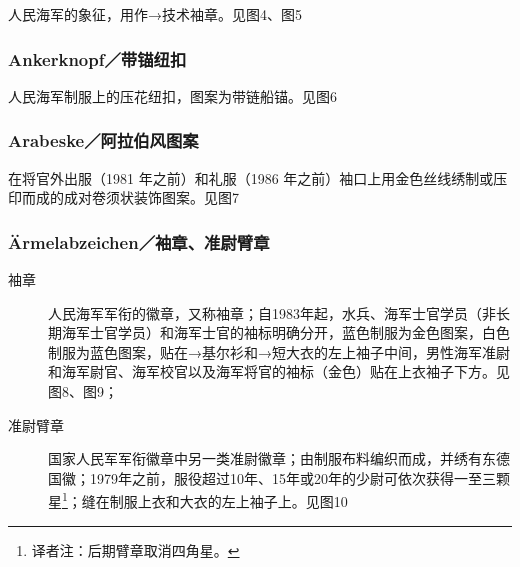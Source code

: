 人民海军的象征，用作→技术袖章。见图4、图5

\subsubsection*{Ankerknopf／带锚纽扣}%

人民海军制服上的压花纽扣，图案为带链船锚。见图6

\subsubsection*{Arabeske／阿拉伯风图案}

在将官外出服（1981 年之前）和礼服（1986 年之前）袖口上用金色丝线绣制或压印而成的成对卷须状装饰图案。见图7

\subsubsection*{Ärmelabzeichen／袖章、准尉臂章}

\begin{description}

    \item[袖章] 人民海军军衔的徽章，又称袖章；自1983年起，水兵、海军士官学员（非长期海军士官学员）和海军士官的袖标明确分开，蓝色制服为金色图案，白色制服为蓝色图案，贴在→基尔衫和→短大衣的左上袖子中间，男性海军准尉和海军尉官、海军校官以及海军将官的袖标（金色）贴在上衣袖子下方。见图8、图9；

    \item[准尉臂章] 国家人民军军衔徽章中另一类准尉徽章；由制服布料编织而成，并绣有东德国徽；1979年之前，服役超过10年、15年或20年的少尉可依次获得一至三颗星\footnote{译者注：后期臂章取消四角星。\cite{clarionv}}；缝在制服上衣和大衣的左上袖子上。见图10 

\end{description}

